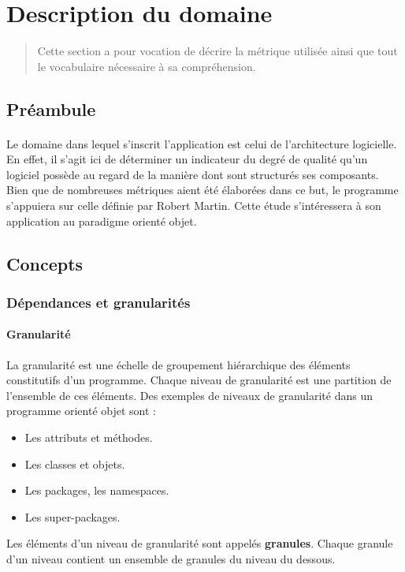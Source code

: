 \documentclass{scrartcl}
\begin{document}

\newpage
\section{Description du domaine}

    \begin{abstract}
        Cette section a pour vocation de décrire la métrique utilisée ainsi que tout le vocabulaire nécessaire à sa compréhension.
    \end{abstract}

\subsection{Préambule}

    \paragraph{}Le domaine dans lequel s'inscrit l'application est celui de l'architecture logicielle. En effet, il s'agit ici de déterminer un indicateur du degré de qualité qu'un logiciel possède au regard de la manière dont sont structurés ses composants. Bien que de nombreuses métriques aient été élaborées dans ce but, le programme s'appuiera sur celle définie par Robert Martin\cite{Martin:1994}. Cette étude s'intéressera à son application au paradigme orienté objet. 
    
\subsection{Concepts}
\label{mm:concepts}

\subsubsection{Dépendances et granularités}
    \paragraph{Granularité}La granularité est une échelle de groupement hiérarchique des éléments constitutifs d'un programme. Chaque niveau de granularité est une partition de l'ensemble de ces éléments. Des exemples de niveaux de granularité dans un programme orienté objet sont :
    \begin{itemize}
        \item Les attributs et méthodes.
        \item Les classes et objets.
        \item Les packages, les namespaces.
        \item Les super-packages.
    \end{itemize}
    Les éléments d'un niveau de granularité sont appelés \textbf{granules}. Chaque granule d'un niveau contient un ensemble de granules du niveau du dessous.
    
\end{document}
